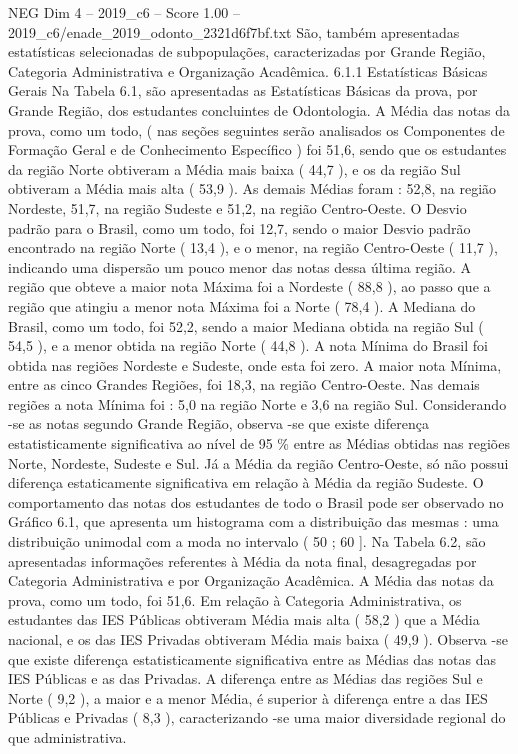 \begin{textsample}{NEG Dim 4 – 2019\_c6 – Score 1.00 – 2019\_c6/enade\_2019\_odonto\_2321d6f7bf.txt}
São, também apresentadas estatísticas selecionadas de subpopulações, caracterizadas por Grande Região, Categoria Administrativa e Organização Acadêmica. 6.1.1 Estatísticas Básicas Gerais Na Tabela 6.1, são apresentadas as Estatísticas Básicas da prova, por Grande Região, dos estudantes concluintes de Odontologia.
A Média das notas da prova, como um todo, ( nas seções seguintes serão analisados os Componentes de Formação Geral e de Conhecimento Específico ) foi 51,6, sendo que os estudantes da região Norte obtiveram a Média mais baixa ( 44,7 ), e os da região Sul obtiveram a Média mais alta ( 53,9 ).
As demais Médias foram : 52,8, na região Nordeste, 51,7, na região Sudeste e 51,2, na região Centro-Oeste.
O Desvio padrão para o Brasil, como um todo, foi 12,7, sendo o maior Desvio padrão encontrado na região Norte ( 13,4 ), e o menor, na região Centro-Oeste ( 11,7 ), indicando uma dispersão um pouco menor das notas dessa última região.
A região que obteve a maior nota Máxima foi a Nordeste ( 88,8 ), ao passo que a região que atingiu a menor nota Máxima foi a Norte ( 78,4 ).
A Mediana do Brasil, como um todo, foi 52,2, sendo a maior Mediana obtida na região Sul ( 54,5 ), e a menor obtida na região Norte ( 44,8 ).
A nota Mínima do Brasil foi obtida nas regiões Nordeste e Sudeste, onde esta foi zero.
A maior nota Mínima, entre as cinco Grandes Regiões, foi 18,3, na região Centro-Oeste.
Nas demais regiões a nota Mínima foi : 5,0 na região Norte e 3,6 na região Sul.
Considerando -se as notas segundo Grande Região, observa -se que existe diferença estatisticamente significativa ao nível de 95 \% entre as Médias obtidas nas regiões Norte, Nordeste, Sudeste e Sul.
Já a Média da região Centro-Oeste, só não possui diferença estaticamente significativa em relação à Média da região Sudeste.
O comportamento das notas dos estudantes de todo o Brasil pode ser observado no Gráfico 6.1, que apresenta um histograma com a distribuição das mesmas : uma distribuição unimodal com a moda no intervalo ( 50 ; 60 ].
Na Tabela 6.2, são apresentadas informações referentes à Média da nota final, desagregadas por Categoria Administrativa e por Organização Acadêmica.
A Média das notas da prova, como um todo, foi 51,6.
Em relação à Categoria Administrativa, os estudantes das IES Públicas obtiveram Média mais alta ( 58,2 ) que a Média nacional, e os das IES Privadas obtiveram Média mais baixa ( 49,9 ).
Observa -se que existe diferença estatisticamente significativa entre as Médias das notas das IES Públicas e as das Privadas.
A diferença entre as Médias das regiões Sul e Norte ( 9,2 ), a maior e a menor Média, é superior à diferença entre a das IES Públicas e Privadas ( 8,3 ), caracterizando -se uma maior diversidade regional do que administrativa.

\end{textsample}
